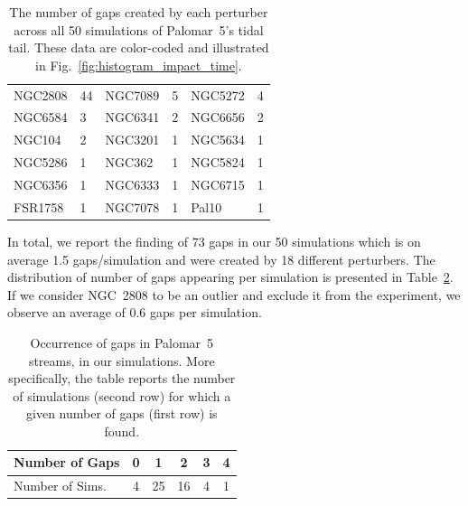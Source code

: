 \documentclass{aa}
\begin{document}
    \begin{table}[h]
      \centering
      \begin{tabular}{|ll|ll|ll|}
      \hline
      NGC2808 & 44 & NGC7089 & 5 & NGC5272 & 4 \\
      NGC6584 & 3 & NGC6341 & 2 & NGC6656 & 2 \\
      NGC104 & 2 & NGC3201 & 1 & NGC5634 & 1 \\
      NGC5286 & 1 & NGC362 & 1 & NGC5824 & 1 \\
      NGC6356 & 1 & NGC6333 & 1 & NGC6715 & 1 \\
      FSR1758 & 1 & NGC7078 & 1 & Pal10 & 1 \\
      \hline
      \end{tabular}
      \caption{The number of gaps created by each perturber across all 50 simulations of Palomar~5's tidal tail. These data are color-coded and illustrated in Fig.~\ref{fig:histogram_impact_time}.}
      \label{tab:gaps_per_perturber}
    \end{table} 
    
    In total, we report the finding of 73 gaps in our 50 simulations which is on average 1.5 gaps/simulation and were created by 18 different perturbers. The distribution of number of gaps appearing per simulation is presented in Table~\ref{table:gap_distribution}. If we consider NGC~2808 to be an outlier and exclude it from the experiment, we observe an average of 0.6 gaps per simulation.  
    
    \begin{table}[h]
      \centering
        \begin{tabular}{|l|c|c|c|c|c|}
          \hline
          Number of Gaps & 0 & 1 & 2 & 3 & 4 \\
          \hline
          Number of Sims. & 4 & 25 & 16 & 4 & 1 \\
          \hline
        \end{tabular}
        \vspace{0.5cm}
      \caption{Occurrence of gaps in Palomar~5 streams,  in our simulations. More specifically, the table reports the number of simulations (second row) for which a given number of gaps (first row) is found. }\label{table:gap_distribution}
    \end{table}
\end{document}
